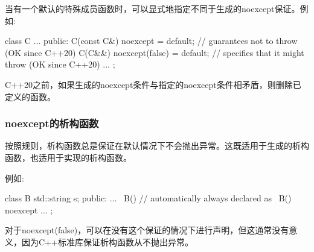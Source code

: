 当有一个默认的特殊成员函数时，可以显式地指定不同于生成的noexcept保证。例如:

\begin{cppcode}
class C
{
	...
public:
	C(const C&) noexcept = default; // guarantees not to throw (OK since C++20)
	C(C&&) noexcept(false) = default; // specifies that it might throw (OK since C++20)
	...
};
\end{cppcode}

C++20之前，如果生成的noexcept条件与指定的noexcept条件相矛盾，则删除已定义的函数。

\subsubsection{noexcept的析构函数}

按照规则，析构函数总是保证在默认情况下不会抛出异常。这既适用于生成的析构函数，也适用于实现的析构函数。

例如:

\begin{cppcode}
class B
{
	std::string s;
	public:
	...
	~B() { // automatically always declared as ~B() noexcept
		...
	}
};
\end{cppcode}

对于noexcept(false)，可以在没有这个保证的情况下进行声明，但这通常没有意义，因为C++标准库保证析构函数从不抛出异常。


































